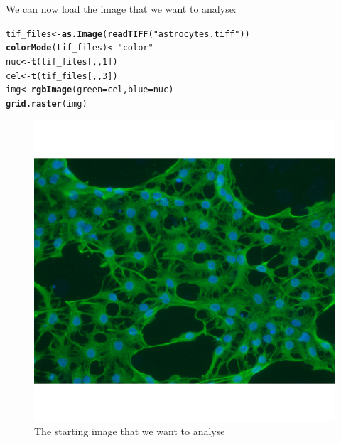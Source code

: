 \documentclass{article}\usepackage[]{graphicx}\usepackage[]{color}
\makeatletter
\def\maxwidth{ %
  \ifdim\Gin@nat@width>\linewidth
    \linewidth
  \else
    \Gin@nat@width
  \fi
}
\newcommand{\hlnum}[1]{\textcolor[rgb]{0.686,0.059,0.569}{#1}}%
\newcommand{\hlstr}[1]{\textcolor[rgb]{0.192,0.494,0.8}{#1}}%
\newcommand{\hlstd}[1]{\textcolor[rgb]{0.345,0.345,0.345}{#1}}%
\newcommand{\hlkwb}[1]{\textcolor[rgb]{0.69,0.353,0.396}{#1}}%
\newcommand{\hlkwc}[1]{\textcolor[rgb]{0.333,0.667,0.333}{#1}}%
\newcommand{\hlkwd}[1]{\textcolor[rgb]{0.737,0.353,0.396}{\textbf{#1}}}%
\newenvironment{kframe}{%
 \def\at@end@of@kframe{}%
 \ifinner\ifhmode%
  \def\at@end@of@kframe{\end{minipage}}%
  \begin{minipage}{\columnwidth}%
 \fi\fi%
 \def\FrameCommand##1{\hskip\@totalleftmargin \hskip-\fboxsep
 \colorbox{shadecolor}{##1}\hskip-\fboxsep
     \hskip-\linewidth \hskip-\@totalleftmargin \hskip\columnwidth}%
 \MakeFramed {\advance\hsize-\width
   \@totalleftmargin\z@ \linewidth\hsize
   \@setminipage}}%
 {\par\unskip\endMakeFramed%
 \at@end@of@kframe}
\newenvironment{knitrout}{}{} %
\makeatother
\begin{document}
We can now load the image that we want to analyse:
\begin{knitrout}
\color{fgcolor}\begin{kframe}
\begin{alltt}
\hlstd{tif_files} \hlkwb{<-} \hlkwd{as.Image}\hlstd{(}\hlkwd{readTIFF}\hlstd{(}\hlstr{"astrocytes.tiff"}\hlstd{))}
\hlkwd{colorMode}\hlstd{(tif_files)} \hlkwb{<-} \hlstr{"color"}
\hlstd{nuc} \hlkwb{<-} \hlkwd{t}\hlstd{(tif_files[, ,} \hlnum{1}\hlstd{])}
\hlstd{cel} \hlkwb{<-} \hlkwd{t}\hlstd{(tif_files[, ,} \hlnum{3}\hlstd{])}
\hlstd{img} \hlkwb{<-} \hlkwd{rgbImage}\hlstd{(}\hlkwc{green} \hlstd{= cel,} \hlkwc{blue} \hlstd{= nuc)}
\hlkwd{grid.raster}\hlstd{(img)}
\end{alltt}
\end{kframe}\begin{figure}[]


{\centering \includegraphics[width=\maxwidth]{knit_figure/figfull_image} 

}

\caption[The starting image that we want to analyse]{The starting image that we want to analyse\label{fig:full.image}}
\end{figure}


\end{knitrout}
\end{document}
